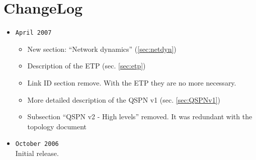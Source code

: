 \documentclass[a4paper]{article}
\begin{document}
\section{ChangeLog}
\begin{itemize}
	\item \verb|April 2007|
		\begin{itemize}
			\item New section: ``Network dynamics'' (\ref{sec:netdyn})
			\item Description of the ETP (sec.  \ref{sec:etp})
			\item Link ID section remove. With the ETP they are no
				more necessary.
			\item More detailed description of the QSPN v1 (sec. \ref{sec:QSPNv1})
			\item Subsection ``QSPN v2 - High levels'' removed. It
				was redundant with the topology
				document\cite{ntktopology}
		\end{itemize}
	\item \verb|October 2006|\\
		Initial release.
\end{itemize}
\end{document}
